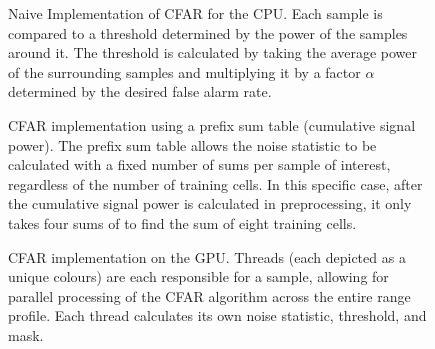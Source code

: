 \begin{figure}[htbp]
    \caption{Naive Implementation of CFAR for the CPU. Each sample is compared to a threshold determined by the power of the samples around it. The threshold is calculated by taking the average power of the surrounding samples and multiplying it by a factor \(\alpha\) determined by the desired false alarm rate.}
    \label{fig:naive-cfar}
\end{figure}

\begin{figure}[htbp]
    \label{fig:prefix-sum-table}
    \caption{CFAR implementation using a prefix sum table (cumulative signal power). The prefix sum table allows the noise statistic to be calculated with a fixed number of sums per sample of interest, regardless of the number of training cells. In this specific case, after the cumulative signal power is calculated in preprocessing, it only takes four sums of to find the sum of eight training cells.}
\end{figure}

\begin{figure}[htbp]
    \label{fig:gpu-cfar}
    \caption{CFAR implementation on the GPU. Threads (each depicted as a unique colours) are each responsible for a sample, allowing for parallel processing of the CFAR algorithm across the entire range profile. Each thread calculates its own noise statistic, threshold, and mask.}
\end{figure}


%     

